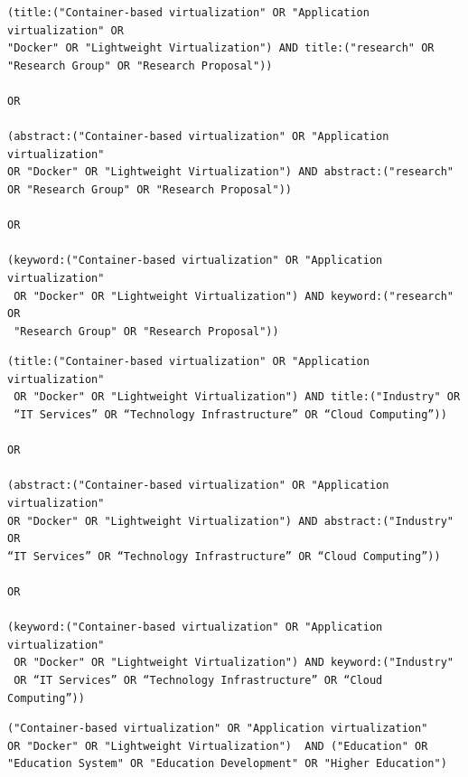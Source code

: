 \begin{tcolorbox}[
  colback=gray!5, 
  colframe=black!60, 
  title=Cadena de búsqueda en Springer para investigación, 
  fonttitle=\bfseries, 
  sharp corners=south
]
\scriptsize %
\begin{verbatim}
(title:("Container-based virtualization" OR "Application virtualization" OR 
"Docker" OR "Lightweight Virtualization") AND title:("research" OR 
"Research Group" OR "Research Proposal"))

OR

(abstract:("Container-based virtualization" OR "Application virtualization" 
OR "Docker" OR "Lightweight Virtualization") AND abstract:("research" 
OR "Research Group" OR "Research Proposal"))

OR 

(keyword:("Container-based virtualization" OR "Application virtualization"
 OR "Docker" OR "Lightweight Virtualization") AND keyword:("research" OR 
 "Research Group" OR "Research Proposal"))

\end{verbatim}
\end{tcolorbox}

\begin{tcolorbox}[
  colback=gray!5, 
  colframe=black!60, 
  title=Cadena de búsqueda en Springer para extensión, 
  fonttitle=\bfseries, 
  sharp corners=south
]
\scriptsize %
\begin{verbatim}
(title:("Container-based virtualization" OR "Application virtualization"
 OR "Docker" OR "Lightweight Virtualization") AND title:("Industry" OR 
 “IT Services” OR “Technology Infrastructure” OR “Cloud Computing”))

OR

(abstract:("Container-based virtualization" OR "Application virtualization" 
OR "Docker" OR "Lightweight Virtualization") AND abstract:("Industry" OR 
“IT Services” OR “Technology Infrastructure” OR “Cloud Computing”))

OR 

(keyword:("Container-based virtualization" OR "Application virtualization"
 OR "Docker" OR "Lightweight Virtualization") AND keyword:("Industry" 
 OR “IT Services” OR “Technology Infrastructure” OR “Cloud Computing”))

\end{verbatim}
\end{tcolorbox}

\begin{tcolorbox}[
  colback=gray!5, 
  colframe=black!60, 
  title=Cadena de búsqueda en Science Direct para educación, 
  fonttitle=\bfseries, 
  sharp corners=south
]
\scriptsize %
\begin{verbatim}
("Container-based virtualization" OR "Application virtualization" 
OR "Docker" OR "Lightweight Virtualization")  AND ("Education" OR 
"Education System" OR "Education Development" OR "Higher Education")
\end{verbatim}
\end{tcolorbox}


